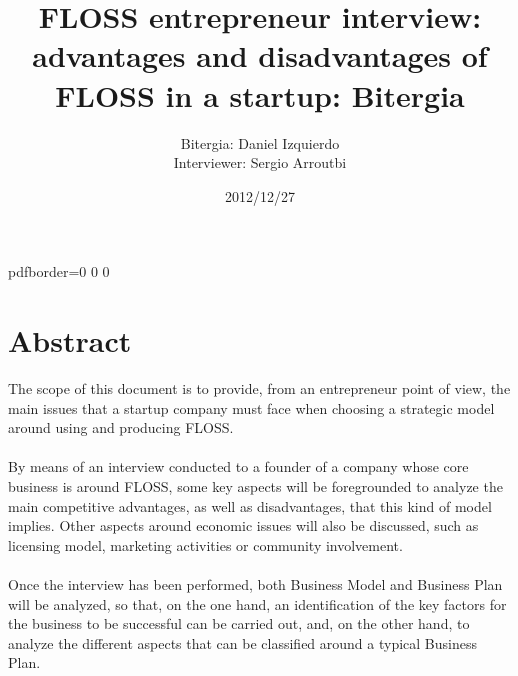 \documentclass[11pt]{article}
\title{\textbf{FLOSS entrepreneur interview: advantages and disadvantages of FLOSS in a startup: Bitergia}}
\author{Bitergia: Daniel Izquierdo\\
Interviewer: Sergio Arroutbi}
\date{2012/12/27}
\newcounter{question}
\newcounter{answer}
\begin{document}
\newcommand\Que[1]{%
   \leavevmode\par
   \stepcounter{question}
   \noindent
   Q\thequestion. #1\par}
   
\newcommand\Ans[1]{%
   \stepcounter{answer}
   \noindent
   A\thequestion. #1\par}

\hypersetup
{   
pdfborder={0 0 0}
}

\maketitle

\tableofcontents

\pagebreak

\section{Abstract}
The scope of this document is to provide, from an entrepreneur point of view, the main issues that a startup company must face when choosing a strategic model around using and producing FLOSS.\\
\\
By means of an interview conducted to a founder of a company whose core business is around FLOSS, some key aspects will be foregrounded to analyze the main competitive advantages, as well as disadvantages, that this kind of model implies. Other aspects around economic issues will also be discussed, such as licensing model, marketing activities or community involvement.\\
\\
Once the interview has been performed, both Business Model and Business Plan will be analyzed, so that, on the one hand, an identification of the key factors for the business to be successful can be carried out, and, on the other hand, to analyze the different aspects that can be classified around a typical Business Plan.
\end{document}

